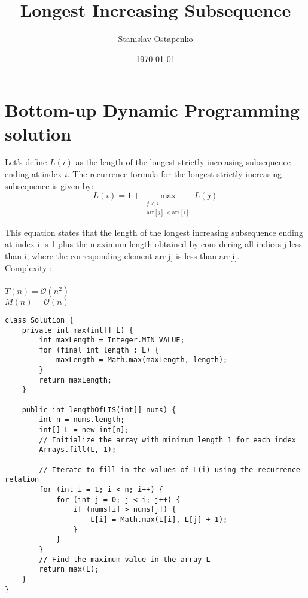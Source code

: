 \documentclass{article}
\begin{document}
    \title{Longest Increasing Subsequence}
    \author{Stanislav Ostapenko}
    \date{\today}
    \maketitle

	\tableofcontents %
	\lstlistoflistings %

    \section{Bottom-up Dynamic Programming solution}
    Let's define $L(i)$ as the length of the longest strictly increasing subsequence ending at index $i$.
    The recurrence formula for the longest strictly increasing subsequence is given by:
    \[ L(i) = 1 + \max_{\substack{j < i \\ \text{arr}[j] < \text{arr}[i]}} L(j) \]

    This equation states that the length of the longest increasing subsequence ending at index i is 1 plus the maximum length obtained by considering all indices j less than i, where the corresponding element arr[j] is less than arr[i].
    \\

    \noindent
    Complexity :\\
    \\
    \noindent
    $T(n) = \mathcal{O}(n^{2})$
    \\
    $M(n) = \mathcal{O}(n)$

    \begin{lstlisting}[caption=$\mathcal{O}(n^{2})$ DP solution]
class Solution {
	private int max(int[] L) {
		int maxLength = Integer.MIN_VALUE;
		for (final int length : L) {
			maxLength = Math.max(maxLength, length);
		}
		return maxLength;
	}
	
	public int lengthOfLIS(int[] nums) {
		int n = nums.length;
		int[] L = new int[n];
		// Initialize the array with minimum length 1 for each index
		Arrays.fill(L, 1);
		
		// Iterate to fill in the values of L(i) using the recurrence relation
		for (int i = 1; i < n; i++) {
			for (int j = 0; j < i; j++) {
				if (nums[i] > nums[j]) {
					L[i] = Math.max(L[i], L[j] + 1);
				}
			}
		}
		// Find the maximum value in the array L
		return max(L);
	}
}
    \end{lstlisting}
\end{document}
